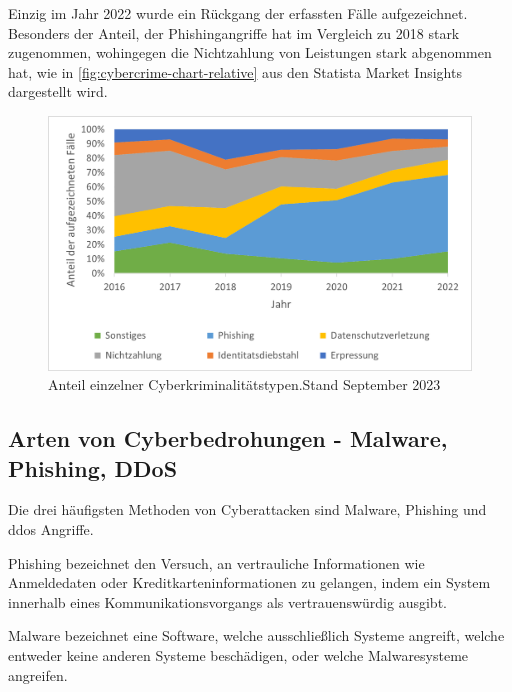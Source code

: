 Einzig im Jahr 2022 wurde ein Rückgang der erfassten Fälle aufgezeichnet.
Besonders der Anteil, der Phishingangriffe hat im Vergleich zu 2018 stark zugenommen, wohingegen die Nichtzahlung von Leistungen stark abgenommen hat, wie in \autoref{fig:cybercrime-chart-relative} aus den Statista Market Insights\autocite[\vglf][]{statista-cybersecurity-cybercrime} dargestellt wird.

\begin{figure}[htpb]
    \centering
    \includegraphics[width = 0.75\linewidth, trim = {0.55cm 0.3cm 0.4cm 0.25cm}, clip]{src/abbildungen/Anteile_Cyberkriminalitaet}
    \captionsetup{width=\linewidth, format=hang}
    \caption[Anteil einzelner Cyberkriminalitätstypen]{Anteil einzelner Cyberkriminalitätstypen.\newline Stand September 2023}
    \label{fig:cybercrime-chart-relative}
\end{figure}

\subsection[Arten von Cyberbedrohungen]{Arten von Cyberbedrohungen - Malware, Phishing, DDoS}\label{subsec:arten-von-cyberbedrohungen---malware-phishing-ddos}

Die drei häufigsten Methoden von Cyberattacken sind Malware, Phishing und \ac{ddos} Angriffe.

\begin{definition}
    \label{def:phishing}
    Phishing bezeichnet den Versuch, an vertrauliche Informationen wie Anmeldedaten oder Kreditkarteninformationen zu gelangen, indem ein System innerhalb eines Kommunikationsvorgangs als vertrauenswürdig ausgibt.\autocite[\vglf][]{study-on-phishing-attacks:2018}
\end{definition}

\begin{definition}
    \label{def:malware}
    Malware bezeichnet eine Software, welche ausschließlich Systeme angreift, welche entweder keine anderen Systeme beschädigen, oder welche Malwaresysteme angreifen.\autocite[\vglf][\pagef 108f.]{definition-malware-2010}
\end{definition}

